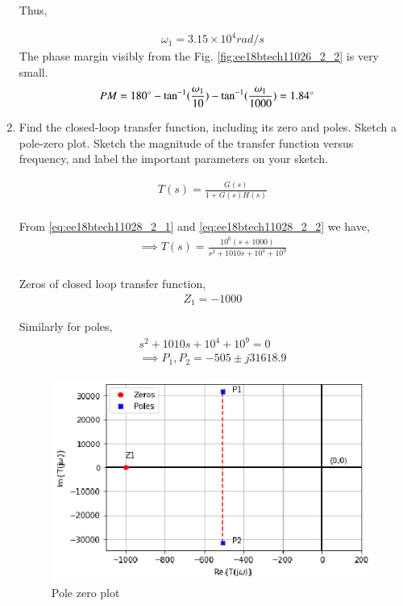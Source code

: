 \begin{enumerate}[label=\arabic*.,ref=\theenumi]
Thus, 

\begin{align}
     \omega_{1} = 3.15 \times 10^{4} rad/s
\end{align}
The phase margin visibly from the Fig. \ref{fig:ee18btech11026_2_2} is very small.
\begin{align}
    PM = 180 \degree - \tan^{-1}(\frac{\omega_{1}}{10}) - \tan^{-1}(\frac{\omega_{1}}{1000})
      & = 1.84 \degree
\end{align}

\item Find the closed-loop transfer function, including its zero
and poles. Sketch a pole-zero plot. Sketch the magnitude of
the transfer function versus frequency, and label the important parameters on your sketch.
\\ 
\solution

\begin{align}
    T(s) = \frac{G(s)}{1 + G(s)H(s)}
    \\
\end{align}

From \eqref{eq:ee18btech11028_2_1} and \eqref{eq:ee18btech11028_2_2} we have,
\begin{align}
    \implies T(s) = \frac{10^{6}(s+1000)}{s^{2} + 1010s + 10^{4} + 10^{9}}
    \\
\end{align}

Zeros of closed loop transfer function,
\begin{align}
    Z_{1} = -1000
\end{align}

Similarly for poles,
\begin{align}
    s^{2} + 1010s + 10^{4} + 10^{9} = 0
    \\
    \implies P_{1}, P_{2} = -505 \pm j31618.9
\end{align}

\begin{figure}[!ht]
    \centering
    \includegraphics[width=\columnwidth]{./figs/ee18btech11028/ee18btech11028_2_3.eps}
    \caption{Pole zero plot}
    \label{fig:ee18btech11026_2_3}
\end{figure}



\end{enumerate}
